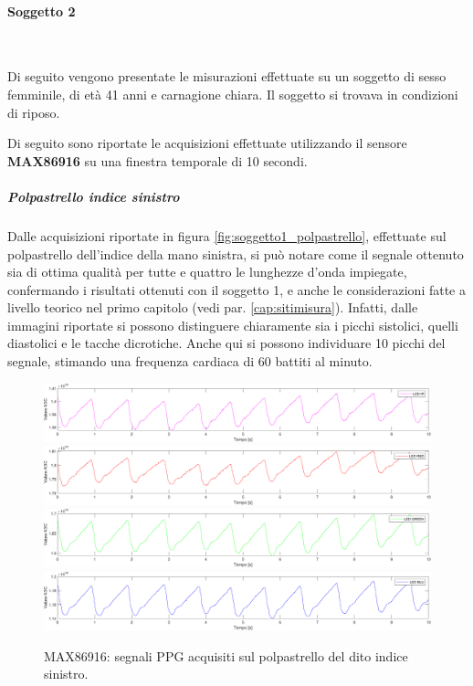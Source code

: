 \clearpage
\paragraph{Soggetto 2}~

Di seguito vengono presentate le misurazioni effettuate su un soggetto di sesso femminile, di età 41 anni e carnagione chiara. Il soggetto si trovava in condizioni di riposo.

\vspace{0.5cm}

\noindent Di seguito sono riportate le acquisizioni effettuate utilizzando il sensore \textbf{MAX86916} su una finestra temporale di 10 secondi.

\subparagraph{Polpastrello indice sinistro}
Dalle acquisizioni riportate in figura \ref{fig:soggetto1_polpastrello}, effettuate sul polpastrello dell'indice della mano sinistra, si può notare come il segnale ottenuto sia di ottima qualità per tutte e quattro le lunghezze d'onda impiegate, confermando i risultati ottenuti con il soggetto 1, e anche le considerazioni fatte a livello teorico nel primo capitolo (vedi par. \ref{cap:sitimisura}). Infatti, dalle immagini riportate si possono distinguere chiaramente sia i picchi sistolici, quelli diastolici e le tacche dicrotiche. Anche qui si possono individuare 10 picchi del segnale, stimando una frequenza cardiaca di 60 battiti al minuto.
\begin{figure}[h]
	\centering
	\includegraphics[width=1\linewidth]{ImageFiles/Misure Preliminari/Soggetto 2/max86916/polpastrello_ired}
	\includegraphics[width=1\linewidth]{ImageFiles/Misure Preliminari/Soggetto 2/max86916/polpastrello_red}
	\includegraphics[width=1\linewidth]{ImageFiles/Misure Preliminari/Soggetto 2/max86916/polpastrello_green}
	\includegraphics[width=1\linewidth]{ImageFiles/Misure Preliminari/Soggetto 2/max86916/polpastrello_blu}
	\caption{MAX86916: segnali PPG acquisiti sul polpastrello del dito indice sinistro.}
	\label{fig:soggetto2_MAX86916_polpastrello}
\end{figure}


